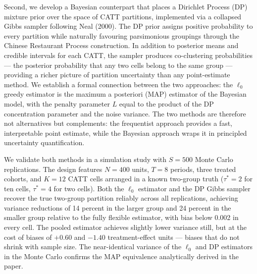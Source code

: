 \documentclass[12pt]{article}
\begin{document}
Second, we develop a Bayesian counterpart that places a Dirichlet Process
(DP) mixture prior over the space of CATT partitions, implemented via a
collapsed Gibbs sampler following Neal (2000). The DP prior assigns positive
probability to every partition while naturally favouring parsimonious
groupings through the Chinese Restaurant Process construction. In addition
to posterior means and credible intervals for each CATT, the sampler
produces co-clustering probabilities --- the posterior probability that any
two cells belong to the same group --- providing a richer picture of
partition uncertainty than any point-estimate method. We establish a formal
connection between the two approaches: the $\ell_0$ greedy estimator is the
maximum a posteriori (MAP) estimator of the Bayesian model, with the penalty
parameter $L$ equal to the product of the DP concentration parameter and the
noise variance. The two methods are therefore not alternatives but
complements: the frequentist approach provides a fast, interpretable point
estimate, while the Bayesian approach wraps it in principled uncertainty
quantification.

We validate both methods in a simulation study with $S = 500$ Monte Carlo
replications. The design features $N = 400$ units, $T = 8$ periods, three
treated cohorts, and $K = 12$ CATT cells arranged in a known two-group truth
($\tau^* = 2$ for ten cells, $\tau^* = 4$ for two cells). Both the $\ell_0$
estimator and the DP Gibbs sampler recover the true two-group partition
reliably across all replications, achieving variance reductions of 14 percent
in the larger group and 24 percent in the smaller group relative to the fully
flexible estimator, with bias below 0.002 in every cell. The pooled estimator
achieves slightly lower variance still, but at the cost of biases of $+0.60$
and $-1.40$ treatment-effect units --- biases that do not shrink with sample
size. The near-identical variance of the $\ell_0$ and DP estimators in the
Monte Carlo confirms the MAP equivalence analytically derived in the paper.
\end{document}
